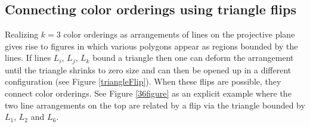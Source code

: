 \documentclass[pdftex]{sigma}
\theoremstyle{definition}
\numberwithin{equation}{section}
\begin{document}
\subsection{Connecting color orderings using triangle flips}

Realizing $k=3$ color orderings as arrangements of lines on the projective plane gives rise to figures in which various polygons appear as regions bounded by the lines. If lines $L_i$, $L_j$, $L_k$ bound a triangle then one can deform the arrangement until the triangle shrinks to zero size and can then be opened up in a different configuration (see Figure \ref{triangleFlip}). When these flips are possible, they connect color orderings.
See Figure \ref{36figure} as an explicit example where the two
line arrangements on the top are related by a flip via the triangle bounded by $L_1$, $L_2$ and $L_6$.
\end{document}

